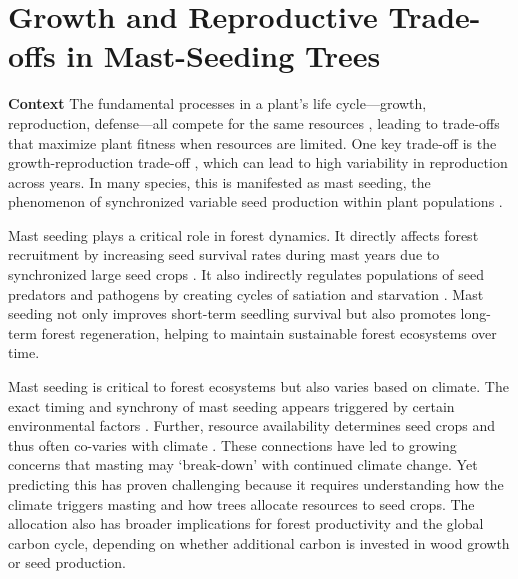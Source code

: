 \documentclass[12pt]{article}
\begin{document}
\section*{Growth and Reproductive Trade-offs in Mast-Seeding Trees}
\textbf{Context} The fundamental processes in a plant’s life cycle—growth, reproduction, defense—all compete for the same resources \citep{bazzaz1997plant}, leading to trade-offs that maximize plant fitness when resources are limited. One key trade-off is the growth-reproduction trade-off \citep{stearns1998evolution}, which can lead to high variability in reproduction across years. In many species, this is manifested as mast seeding, the phenomenon of synchronized variable seed production within plant populations \citep{kelly1994evolutionary}.

Mast seeding plays a critical role in forest dynamics. It directly affects forest recruitment by increasing seed survival rates during mast years due to synchronized large seed crops \citep{silvertown1980evolutionary}. It also indirectly regulates populations of seed predators and pathogens by creating cycles of satiation and starvation \citep{janzen1971seed}. Mast seeding not only improves short-term seedling survival but also promotes long-term forest regeneration, helping to maintain sustainable forest ecosystems over time. 

Mast seeding is critical to forest ecosystems but also varies based on climate. The exact timing and synchrony of mast seeding appears triggered by certain environmental factors \citep{pearse2016mechanisms}. Further, resource availability determines seed crops and thus often co-varies with climate \citep{hacket2016consistent}. These connections have led to growing concerns that masting may `break-down' with continued climate change. Yet predicting this has proven challenging because it requires understanding how the climate triggers masting and how trees allocate resources to seed crops. The allocation also has broader implications for forest productivity and the global carbon cycle, depending on whether additional carbon is invested in wood growth or seed production.

\setlength{\columnsep}{1pt}
\setlength{\intextsep}{0pt}
\end{document}
